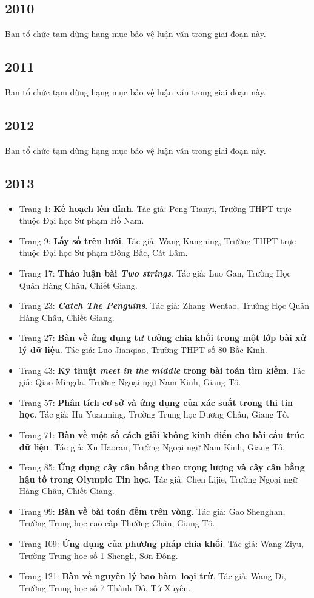 \documentclass[11pt]{article}
\begin{document}
\subsection{2010}
Ban tổ chức tạm dừng hạng mục bảo vệ luận văn trong giai đoạn này.

\subsection{2011}
Ban tổ chức tạm dừng hạng mục bảo vệ luận văn trong giai đoạn này.

\subsection{2012}
Ban tổ chức tạm dừng hạng mục bảo vệ luận văn trong giai đoạn này.

\subsection{2013}
\begin{itemize}[leftmargin=2em]
  \item Trang 1: \textbf{Kế hoạch lên đỉnh}. Tác giả: Peng Tianyi, Trường THPT trực thuộc Đại học Sư phạm Hồ Nam.
  \item Trang 9: \textbf{Lấy số trên lưới}. Tác giả: Wang Kangning, Trường THPT trực thuộc Đại học Sư phạm Đông Bắc, Cát Lâm.
  \item Trang 17: \textbf{Thảo luận bài \emph{Two strings}}. Tác giả: Luo Gan, Trường Học Quân Hàng Châu, Chiết Giang.
  \item Trang 23: \textbf{\emph{Catch The Penguins}}. Tác giả: Zhang Wentao, Trường Học Quân Hàng Châu, Chiết Giang.
  \item Trang 27: \textbf{Bàn về ứng dụng tư tưởng chia khối trong một lớp bài xử lý dữ liệu}. Tác giả: Luo Jianqiao, Trường THPT số 80 Bắc Kinh.
  \item Trang 43: \textbf{Kỹ thuật \emph{meet in the middle} trong bài toán tìm kiếm}. Tác giả: Qiao Mingda, Trường Ngoại ngữ Nam Kinh, Giang Tô.
  \item Trang 57: \textbf{Phân tích cơ sở và ứng dụng của xác suất trong thi tin học}. Tác giả: Hu Yuanming, Trường Trung học Dương Châu, Giang Tô.
  \item Trang 71: \textbf{Bàn về một số cách giải không kinh điển cho bài cấu trúc dữ liệu}. Tác giả: Xu Haoran, Trường Ngoại ngữ Nam Kinh, Giang Tô.
  \item Trang 85: \textbf{Ứng dụng cây cân bằng theo trọng lượng và cây cân bằng hậu tố trong Olympic Tin học}. Tác giả: Chen Lijie, Trường Ngoại ngữ Hàng Châu, Chiết Giang.
  \item Trang 99: \textbf{Bàn về bài toán đếm trên vòng}. Tác giả: Gao Shenghan, Trường Trung học cao cấp Thường Châu, Giang Tô.
  \item Trang 109: \textbf{Ứng dụng của phương pháp chia khối}. Tác giả: Wang Ziyu, Trường Trung học số 1 Shengli, Sơn Đông.
  \item Trang 121: \textbf{Bàn về nguyên lý bao hàm--loại trừ}. Tác giả: Wang Di, Trường Trung học số 7 Thành Đô, Tứ Xuyên.
\end{itemize}
\end{document}
